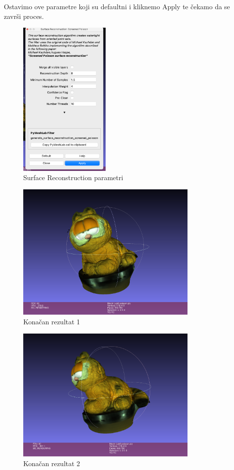 \documentclass[12pt]{article} %
\begin{document}
		Ostavimo ove parametre koji su defaultni i kliknemo Apply te čekamo da se završi proces.
		\begin{figure}[H]
			\centering
			\includegraphics[width=0.4\textwidth]{screenshots/21.png}
			\caption{Surface Reconstruction parametri}
			\label{fig:yourlabel2}
		\end{figure}
		
		
		\begin{figure}[H]
			\centering
			\includegraphics[width=0.8\textwidth]{screenshots/22.png}
			\caption{Konačan rezultat 1}
			\label{fig:yourlabel2}
		\end{figure}
		
		
		\begin{figure}[H]
			\centering
			\includegraphics[width=0.8\textwidth]{screenshots/23.png}
			\caption{Konačan rezultat 2}
			\label{fig:yourlabel2}
		\end{figure}
		
\end{document}
